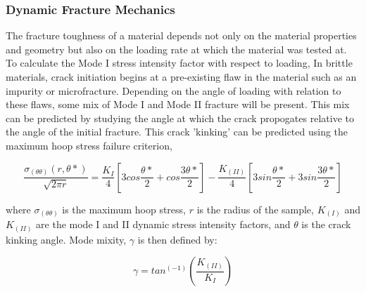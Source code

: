 \documentclass[12pt]{article}
\begin{document}
\subsubsection{Dynamic Fracture Mechanics} %

The fracture toughness of a material depends not only on the material properties and geometry but also on the loading rate at which the material was tested at. To calculate the Mode I stress intensity factor with respect to loading, In brittle materials, crack initiation begins at a pre-existing flaw in the material such as an impurity or microfracture. Depending on the angle of loading with relation to these flaws, some mix of Mode I and Mode II fracture will be present. This mix can be predicted by studying the angle at which the crack propogates relative to the angle of the initial fracture. This crack 'kinking' can be predicted using the maximum hoop stress failure criterion, 

\begin{equation}
\frac{\sigma_(\theta\theta)(r,\theta*)}{\sqrt{2\pi r}} = \frac{K_I}{4}[3cos\frac{\theta*}{2}+cos\frac{3\theta*}{2}]-\frac{K_(II)}{4}[3sin\frac{\theta*}{2}+3sin\frac{3\theta*}{2}]
\end{equation}

where $\sigma_(\theta\theta)$ is the maximum hoop stress, $r$ is the radius of the sample, $K_(I)$ and $K_(II)$ are the mode I and II dynamic stress intensity factors, and $\theta$ is the crack kinking angle. Mode mixity, $\gamma$ is then defined by:

\begin{equation}
\gamma = tan^(-1)(\frac{K_(II)}{K_I})
\end{equation}
\end{document}
